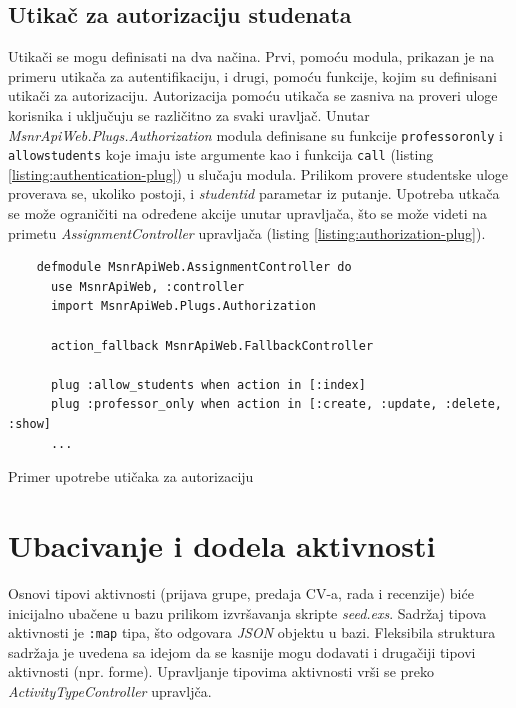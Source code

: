\documentclass[12pt,oneside]{memoir}
\begin{document}
\subsection{Utikač za autorizaciju studenata}
Utikači se mogu definisati na dva načina. Prvi, pomoću modula, prikazan je na primeru utikača za autentifikaciju,
i drugi, pomoću funkcije, kojim su definisani utikači za autorizaciju. Autorizacija pomoću utikača se zasniva na
proveri uloge korisnika i uključuju se različitno za svaki uravljač.
Unutar \emph{MsnrApiWeb.Plugs.Authorization} modula
definisane su funkcije \texttt{professor{\textunderscore}only} i \texttt{allow{\textunderscore}students} koje imaju
iste argumente kao i funkcija \texttt{call} (listing \ref{listing:authentication-plug}) u slučaju modula.
Prilikom provere studentske uloge proverava se, ukoliko postoji, i \emph{student{\textunderscore}id} parametar iz putanje.
Upotreba utkača se može ograničiti na određene akcije unutar upravljača, što se može videti na primetu \emph{AssignmentController} upravljača (listing \ref{listing:authorization-plug}).
\begin{listing}[h!]
  \begin{verbatim}
    defmodule MsnrApiWeb.AssignmentController do
      use MsnrApiWeb, :controller
      import MsnrApiWeb.Plugs.Authorization
    
      action_fallback MsnrApiWeb.FallbackController
    
      plug :allow_students when action in [:index]
      plug :professor_only when action in [:create, :update, :delete, :show]
      ...
\end{verbatim}
\caption{Primer upotrebe utičaka za autorizaciju}
\label{listing:authorization-plug}
\end{listing}
\section{Ubacivanje i dodela aktivnosti}
Osnovi tipovi aktivnosti (prijava grupe, predaja CV-a, rada i recenzije) biće inicijalno ubačene u
bazu prilikom izvršavanja skripte \emph{seed.exs}. Sadržaj tipova aktivnosti je \texttt{:map} tipa, što odgovara
\emph{JSON} objektu u bazi. Fleksibila struktura sadržaja je uvedena sa idejom da se kasnije mogu dodavati i drugačiji
tipovi aktivnosti (npr. forme). Upravljanje tipovima aktivnosti vrši se preko \emph{ActivityTypeController} upravljča.
\end{document}

